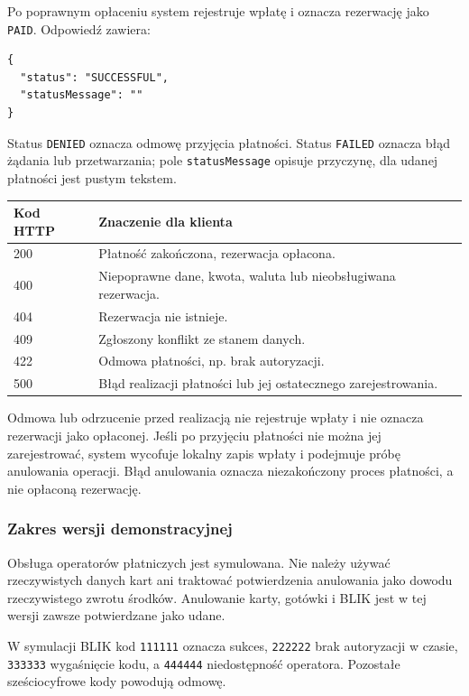 Po poprawnym opłaceniu system rejestruje wpłatę i oznacza rezerwację
jako \texttt{PAID}. Odpowiedź zawiera:
\begin{verbatim}
{
  "status": "SUCCESSFUL",
  "statusMessage": ""
}
\end{verbatim}
Status \texttt{DENIED} oznacza odmowę przyjęcia płatności.
Status \texttt{FAILED} oznacza błąd żądania lub przetwarzania;
pole \texttt{statusMessage} opisuje przyczynę, dla udanej płatności jest pustym tekstem.

\begin{center}
\begin{tabularx}{\textwidth}{lX}
\toprule
Kod HTTP & Znaczenie dla klienta \\
\midrule
200 & Płatność zakończona, rezerwacja opłacona. \\
400 & Niepoprawne dane, kwota, waluta lub nieobsługiwana rezerwacja. \\
404 & Rezerwacja nie istnieje. \\
409 & Zgłoszony konflikt ze stanem danych. \\
422 & Odmowa płatności, np. brak autoryzacji. \\
500 & Błąd realizacji płatności lub jej ostatecznego zarejestrowania. \\
\bottomrule
\end{tabularx}
\end{center}

Odmowa lub odrzucenie przed realizacją nie rejestruje wpłaty
 i nie oznacza rezerwacji jako opłaconej. Jeśli po przyjęciu płatności
nie można jej zarejestrować, system wycofuje lokalny zapis wpłaty
 i podejmuje próbę anulowania operacji. Błąd anulowania oznacza
niezakończony proces płatności, a nie opłaconą rezerwację.

\subsubsection{Zakres wersji demonstracyjnej}

Obsługa operatorów płatniczych jest symulowana. Nie należy używać
rzeczywistych danych kart ani traktować potwierdzenia anulowania
jako dowodu rzeczywistego zwrotu środków. Anulowanie karty, gotówki
 i BLIK jest w tej wersji zawsze potwierdzane jako udane.

W symulacji BLIK kod \texttt{111111} oznacza sukces,
\texttt{222222} brak autoryzacji w czasie, \texttt{333333} wygaśnięcie
kodu, a \texttt{444444} niedostępność operatora. Pozostałe
sześciocyfrowe kody powodują odmowę.


